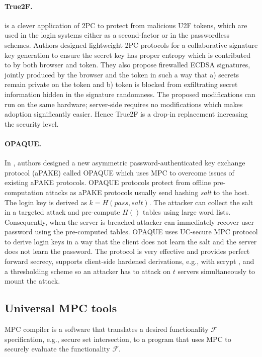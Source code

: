 \documentclass[
  digital, %
  twoside, %
  table,   %
  lof,     %
  lot,     %
]{fithesis3}
\newcounter{ph4_show_guides}
\theoremstyle{definition}
\theoremstyle{remark}
\begin{document}
\paragraph{True2F.} \cite{DCMBR18} is a clever application of 2PC to protect from malicious U2F tokens, which are used in the login systems either as a second-factor or in the passwordless schemes. 
Authors designed lightweight 2PC protocols for a collaborative signature key generation to ensure the secret key has proper entropy which is contributed to by both browser and token. They also propose firewalled ECDSA signatures, jointly produced by the browser and the token in such a way that a) secrets remain private on the token and b) token is blocked from exfiltrating secret information hidden in the signature randomness.
The proposed modifications can run on the same hardware; server-side requires no modifications which makes adoption significantly easier. Hence True2F is a drop-in replacement increasing the security level.
    
\paragraph{OPAQUE.} In \cite{JKX18}, authors designed a new asymmetric password-authenticated key exchange protocol (aPAKE) called OPAQUE which uses MPC to overcome issues of existing aPAKE protocols.
OPAQUE protocols protect from offline pre-computation attacks as aPAKE protocols usually send hashing \emph{salt} to the host. 
The login key is derived as $k=H(pass, salt)$. The attacker can collect the salt in a targeted attack and pre-compute $H()$ tables using large word lists. Consequently, when the server is breached attacker can immediately recover user password using the pre-computed tables. OPAQUE uses UC-secure MPC protocol to derive login keys in a way that the client does not learn the salt and the server does not learn the password. The protocol is very effective and provides perfect forward secrecy, supports client-side hardened derivations, e.g., with scrypt \cite{scrypt}, and a thresholding scheme so an attacker has to attack on $t$ servers simultaneously to mount the attack.

\subsection{Universal MPC tools}
MPC compiler is a software that translates a desired functionality $\mathcal{F}$ specification, e.g., secure set intersection, to a program that uses MPC to securely evaluate the functionality $\mathcal{F}$.
\end{document}
